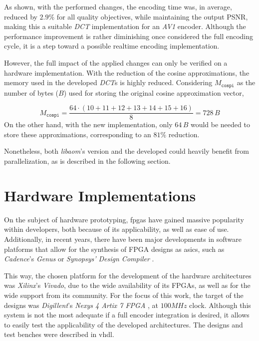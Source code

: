 As shown, with the performed changes, the encoding time was, in average, reduced by $2.9\%$ for all quality objectives, while maintaining the output PSNR, making this a suitable \emph{DCT} implementation for an \emph{AV1} encoder. Although the performance improvement is rather diminishing once considered the full encoding cycle, it is a step toward a possible realtime encoding implementation.

However, the full impact of the applied changes can only be verified on a hardware implementation. With the reduction of the cosine approximations, the memory used in the developed \emph{DCT}s is highly reduced. Considering $M_{\texttt{cospi}}$ as the number of bytes ($B$) used for storing the original cosine approximation vector,

\begin{equation}
    M_{\texttt{cospi}} = \frac{64\cdot (10+11+12+13+14+15+16)}{8} = 728\, B
\end{equation}
On the other hand, with the new implementation, only $64 \, B$  would be needed to store these approximations, corresponding to an $81\%$ reduction.

Nonetheless, both \emph{libaom}'s version and the developed could heavily benefit from parallelization, as is described in the following section.

\section{Hardware Implementations}

On the subject of hardware prototyping, \glspl{fpga} have gained massive popularity within developers, both because of its applicability, as well as ease of use. Additionally, in recent years, there have been major developments in software platforms that allow for the synthesis of FPGA designs as \glspl{asic}, such as \emph{Cadence}'s \emph{Genus} or \emph{Synopsys' Design Compiler} \cite{GenusSynthesisSolution, DesignCompilerGraphical}. 

This way, the chosen platform for the development of the hardware architectures was \emph{Xilinx}'s \emph{Vivado}, due to the wide availability of its FPGAs, as well as for the wide support from its community. For the focus of this work, the target of the designs was \emph{Digillent}'s \emph{Nexys 4 Artix 7 FPGA} \cite{NexysArtix7FPGA}, at $100MHz$ clock. Although this system is not the most adequate if a full encoder integration is desired, it allows to easily test the applicability of the developed architectures. The designs and test benches were described in \gls{vhdl}.

